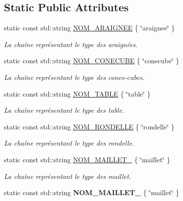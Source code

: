 \subsection*{Static Public Attributes}
\begin{DoxyCompactItemize}
\item 
static const std\+::string \hyperlink{group__inf2990_ga1035430c1c08b95d17f891ae89b33b80}{N\+O\+M\+\_\+\+A\+R\+A\+I\+G\+N\+EE} \{ \char`\"{}araignee\char`\"{} \}
\begin{DoxyCompactList}\small\item\em La chaîne représentant le type des araignées. \end{DoxyCompactList}\item 
static const std\+::string \hyperlink{group__inf2990_gae849656178f4dad34106f525bf37341a}{N\+O\+M\+\_\+\+C\+O\+N\+E\+C\+U\+BE} \{ \char`\"{}conecube\char`\"{} \}
\begin{DoxyCompactList}\small\item\em La chaîne représentant le type des cones-\/cubes. \end{DoxyCompactList}\item 
static const std\+::string \hyperlink{group__inf2990_ga89e651c1a28481ce70f473bd15555114}{N\+O\+M\+\_\+\+T\+A\+B\+LE} \{ \char`\"{}table\char`\"{} \}
\begin{DoxyCompactList}\small\item\em La chaîne représentant le type des table. \end{DoxyCompactList}\item 
static const std\+::string \hyperlink{group__inf2990_ga2ebc17f2d21cd4e66216a7d2c374493e}{N\+O\+M\+\_\+\+R\+O\+N\+D\+E\+L\+LE} \{ \char`\"{}rondelle\char`\"{} \}
\begin{DoxyCompactList}\small\item\em La chaîne représentant le type des rondelle. \end{DoxyCompactList}\item 
static const std\+::string \hyperlink{group__inf2990_ga0c6b49184808c14c52d8e4a2ee00a00e}{N\+O\+M\+\_\+\+M\+A\+I\+L\+L\+E\+T\+\_} \{ \char`\"{}maillet\char`\"{} \}
\begin{DoxyCompactList}\small\item\em La chaîne représentant le type des maillet. \end{DoxyCompactList}\item 
static const std\+::string {\bfseries N\+O\+M\+\_\+\+M\+A\+I\+L\+L\+E\+T\+\_} \{ \char`\"{}maillet\char`\"{} \}
\item 

\end{DoxyCompactItemize}
